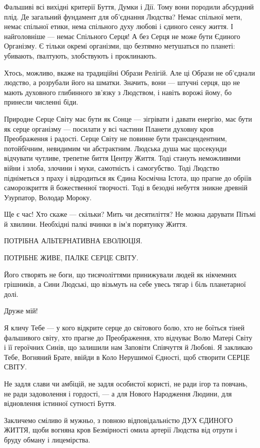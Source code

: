 Фальшиві всі вихідні критерії Буття, Думки і Дії. Тому вони породили абсурдний
плід. Де загальний фундамент для об’єднання Людства? Немає спільної мети, немає
спільної етики, нема спільного духу любові і єдиного сенсу життя. І
найголовніше — немає Спільного Серця! А без Серця не може бути Єдиного
Організму. Є тільки окремі організми, що безтямно метушаться по планеті:
убивають, ґвалтують, злобствують і проклинають.

Хтось, можливо, вкаже на традиційні Образи Релігій. Але ці Образи не об’єднали
людство, а розрубали його на шматки. Значить, вони — штучні серця, що не мають
духовного глибинного зв’язку з Людством, і навіть ворожі йому, бо принесли
численні біди.

Природне Серце Світу має бути як Сонце — зігрівати і давати енергію, має бути
як серце організму — посилати у всі частини Планети духовну кров Преображення і
радості. Серце Світу не повинне бути трансцендентним, потойбічним, невидимим чи
абстрактним. Людська душа має щосекунди відчувати чутливе, трепетне биття
Центру Життя. Тоді стануть неможливими війни і злоба, злочини і муки,
самотність і самогубство. Тоді Людство підніметься з праху і відродиться як
Єдина Космічна Істота, що прагне до обріїв саморозкриття й божественної
творчості. Тоді в безодні небуття зникне древній Узурпатор, Володар Мороку.

Ще є час! Хто скаже — скільки? Мить чи десятиліття? Не можна дарувати Пітьмі й
хвилини. Необхідні палкі вчинки в ім’я порятунку Життя.

ПОТРІБНА АЛЬТЕРНАТИВНА ЕВОЛЮЦІЯ.

ПОТРІБНЕ ЖИВЕ, ПАЛКЕ СЕРЦЕ СВІТУ.

Його створять не боги, що тисячоліттями принижували людей як нікчемних
грішників, а Сини Людські, що візьмуть на себе увесь тягар і біль планетарної
долі.

Друже мій!

Я кличу Тебе — у кого відкрите серце до світового болю, хто не боїться тіней
фальшивого світу, хто прагне до Преображення, хто відчуває Волю Матері Світу і
її героїчних Синів, що залишили нам Заповіти Співчуття й Любові. Я закликаю
Тебе, Вогняний Брате, ввійди в Коло Нерушимої Єдності, щоб створити СЕРЦЕ
СВІТУ.

Не задля слави чи амбіцій, не задля особистої користі, не ради ігор та повчань,
не ради задоволення і гордості, — а для Нового Народження Людини, для
відновлення істинної сутності Буття.

Закличемо сміливо й мужньо, з повною відповідальністю ДУХ ЄДИНОГО ЖИТТЯ, щоби
вогняна кров Безмірності омила артерії Людства від отрути і бруду обману і
лицемірства.

